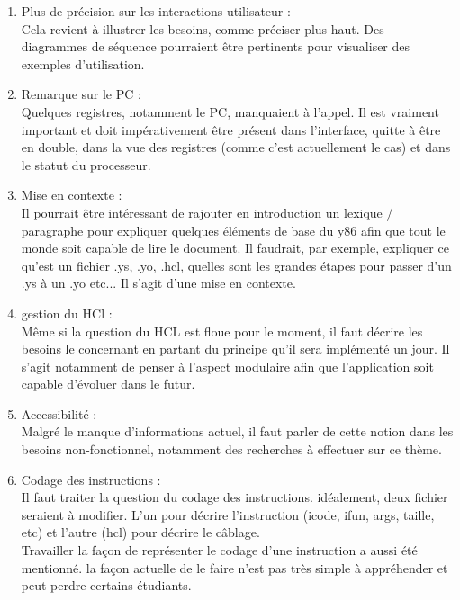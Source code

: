 \documentclass[french]{article}
\begin{document}
\begin{enumerate}
    \item Plus de précision sur les interactions utilisateur :\\
    Cela revient à illustrer les besoins, comme préciser plus haut. Des diagrammes de séquence pourraient être pertinents pour visualiser des exemples d'utilisation.
    \\
    \item Remarque sur le PC :\\
    Quelques registres, notamment le PC, manquaient à l'appel.  Il est vraiment important et doit impérativement être présent dans l'interface, quitte à être en double, dans la vue des registres (comme c'est actuellement le cas) et dans le statut du processeur.
    \\
    \item Mise en contexte :\\
    Il pourrait être intéressant de rajouter en introduction un lexique / paragraphe pour expliquer quelques éléments de base du y86 afin que tout le monde soit capable de lire le document. Il faudrait, par exemple, expliquer ce qu'est un fichier .ys, .yo, .hcl, quelles sont les grandes étapes pour passer d'un .ys à un .yo etc... Il s'agit d'une mise en contexte.
    \\
    \item gestion du HCl :\\
    Même si la question du HCL est floue pour le moment, il faut décrire les besoins le concernant en partant du principe qu'il sera implémenté un jour. Il s'agit notamment de penser à l'aspect modulaire afin que l'application soit capable d'évoluer dans le futur.
    \\
    \item Accessibilité :\\
    Malgré le manque d'informations actuel, il faut parler de cette notion dans les besoins non-fonctionnel, notamment des recherches à effectuer sur ce thème.
    \\
    \item Codage des instructions :\\
    Il faut traiter la question du codage des instructions. idéalement, deux fichier seraient à modifier. L'un pour décrire l'instruction (icode, ifun, args, taille, etc) et l'autre (hcl) pour décrire le câblage.\\
    Travailler la façon de représenter le codage d'une instruction a aussi été mentionné. la façon actuelle de le faire n'est pas très simple à appréhender et peut perdre certains étudiants.

\end{enumerate}
\end{document}
